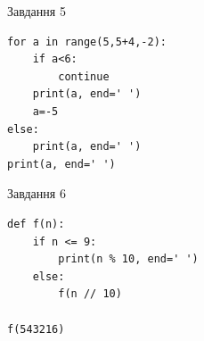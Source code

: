 \documentclass[12pt, ukrainian]{article}
\begin{document}
{\vspace{15mm}
\begin{minipage}[t]{9.7cm}                
{\begin{center}Завдання {5}\end{center}}
\begin{verbatim}
for a in range(5,5+4,-2):
    if a<6:
        continue
    print(a, end=' ')
    a=-5
else:
    print(a, end=' ')
print(a, end=' ')
\end{verbatim}     
\end{minipage}
\vline \hspace{8mm}
\begin{minipage}[t]{8.0cm}                
{\begin{center}Завдання {6}\end{center}}
\begin{verbatim}
def f(n):
    if n <= 9:
        print(n % 10, end=' ')
    else:
        f(n // 10)

f(543216)
\end{verbatim}     
\end{minipage}

}
\newpage
\end{document}
